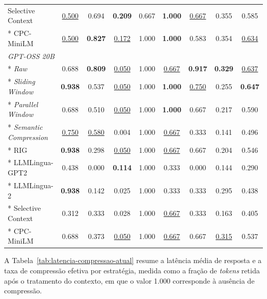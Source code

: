{\begin{longtable}{lcc|cc|cc|c|c}
Selective Context              & \underline{0.500} & 0.694 & \textbf{0.209} & 0.667 & \textbf{1.000} & \underline{0.667} & 0.355 & 0.585 \\*
CPC-MiniLM                     & \underline{0.500} & \textbf{0.827} & \underline{0.172} & 1.000 & \textbf{1.000} & 0.583 & 0.354 & \underline{0.634} \\
\midrule
\multicolumn{9}{l}{\textit{GPT-OSS 20B}} \\*
\textit{Raw}                   & 0.688 & \textbf{0.809} & \underline{0.050} & 1.000 & \underline{0.667} & \textbf{0.917} & \textbf{0.329} & \underline{0.637} \\*
\textit{Sliding Window}        & \textbf{0.938} & 0.537 & \underline{0.050} & 1.000 & \textbf{1.000} & \underline{0.750} & 0.255 & \textbf{0.647} \\*
\textit{Parallel Window}       & 0.688 & 0.510 & \underline{0.050} & 1.000 & \textbf{1.000} & 0.667 & 0.217 & 0.590 \\*
\textit{Semantic Compression}  & \underline{0.750} & \underline{0.580} & 0.004 & 1.000 & \underline{0.667} & 0.333 & 0.141 & 0.496 \\*
RIG                            & \textbf{0.938} & 0.298 & \underline{0.050} & 1.000 & \underline{0.667} & 0.667 & 0.204 & 0.546 \\*
LLMLingua-GPT2                 & 0.438 & 0.000 & \textbf{0.114} & 1.000 & 0.333 & 0.000 & 0.144 & 0.290 \\*
LLMLingua-2                    & \textbf{0.938} & 0.142 & 0.025 & 1.000 & 0.333 & 0.333 & 0.295 & 0.438 \\*
Selective Context              & 0.312 & 0.333 & 0.028 & 1.000 & \underline{0.667} & 0.333 & 0.163 & 0.405 \\*
CPC-MiniLM                     & 0.688 & 0.373 & \underline{0.050} & 1.000 & \underline{0.667} & 0.667 & \underline{0.315} & 0.537 \\
\end{longtable}
}

A Tabela~\ref{tab:latencia-compressao-atual} resume a latência média de resposta e a taxa de compressão efetiva por estratégia, medida como a fração de \textit{tokens} retida após o tratamento do contexto, em que o valor 1.000 corresponde à ausência de compressão.

